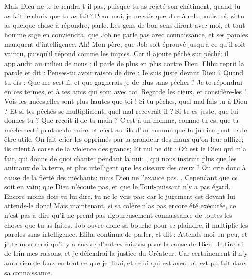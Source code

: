 \begin{multicols}{2}
{Mais Dieu ne te le rendra-t-il pas, puisque tu as rejeté son châtiment, quand tu as fait le choix que tu as fait? Pour moi, je ne sais que dire à cela; mais toi, si tu as quelque chose à répondre, parle.
Les gens de bon sens diront avec moi, et tout homme sage en conviendra,
que Job ne parle pas avec connaissance, et ses paroles manquent d'intelligence.
Ah! Mon père, que Job soit éprouvé jusqu'à ce qu'il soit vaincu, puisqu'il répond comme les impies.
Car il ajoute péché sur péché; il applaudit au milieu de nous ; il parle de plus en plus contre Dieu.
\VerseOne{}Elihu reprit la parole et dit :
Penses-tu avoir raison de dire : Je suis juste devant Dieu ?
Quand tu dis : Que me sert-il, et que gagnerais-je de plus sans pécher ?
Je te répondrai en ces termes, et à tes amis qui sont avec toi.
Regarde les cieux, et considère-les ! Vois les nuées,elles sont plus hautes que toi !
Si tu pèches, quel mal fais-tu à Dieu ? Et si tes péchés se multipliaient, quel mal recevrait-il ?
Si tu es juste, que lui donnes-tu ? Que reçoit-il de ta main ?
C'est à un homme, comme tu es, que ta méchanceté peut seule nuire, et c'est au fils d'un homme que ta justice peut seule être utile.
On fait crier les opprimés par la grandeur des maux qu'on leur afflige; ils crient à cause de la violence des grands;
Et nul ne dit : Où est le Dieu qui m'a fait, qui donne de quoi chanter pendant la nuit ,
qui nous instruit plus que les animaux de la terre, et plus intelligent que les oiseaux des cieux ?
On crie donc à cause de la fierté des méchants; mais Dieu ne l'exauce pas.
.
 Cependant que ce soit en vain; que Dieu n'écoute pas, et que le Tout-puissant n'y a pas égard.
Encore moins dois-tu lui dire, tu ne le vois pas; car le jugement est devant lui, attends-le donc!
Mais maintenant, si sa colère n'as pas encore été exécutée, ce n'est pas à dire qu'il ne prend pas rigoureusement connaissance de toutes les choses que tu as faites.
Job ouvre donc sa bouche pour se plaindre, il multiplie les paroles sans intelligence.
\VerseOne{}Elihu continua de parler, et dit :
Attends-moi un peu, et je te montrerai qu'il y a encore d'autres raisons pour la cause de Dieu.
Je tirerai de loin mes raisons, et je défendrai la justice du Créateur.
Car certainement il n'y aura rien de faux en tout ce que je dirai, et celui qui est avec toi, est parfait dans sa connaissance.
}
\end{multicols}
